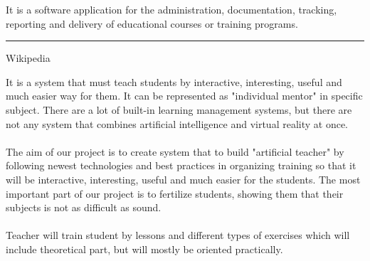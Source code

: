 \documentclass[a4paper, 12pt]{article}
\newenvironment{myblock}[1]{%
	\tcolorbox[beamer,%
	noparskip,breakable,
	colback=LightGreen,colframe=DarkGreen,%
	colbacklower=LimeGreen!75!LightGreen,%
	title=#1]}%
{\endtcolorbox}
\begin{document}
	\vspace{1cm}
	\large{
		\begin{myblock}{"Learning management system"}
			It is a software application for the administration, documentation, tracking, reporting and delivery of educational courses or training programs.
			\rule{\textwidth}{0.4pt}
			{
				\begin{flushright}
					{\Large Wikipedia}
				\end{flushright}
			}
		\end{myblock}
		\vspace{1cm}
		\begin{myblock}{"Artificial teacher"}
			It is a system that must teach students by interactive, interesting, useful and much easier way for them. It can be represented as "individual mentor" in specific subject.
		\end{myblock}
		\vspace{1cm}
		There are a lot of built-in learning management systems, but there are not any system that combines artificial intelligence and virtual reality at once. \\
		\\
		The aim of our project is to create system that to build "artificial teacher" by following newest technologies and best practices in organizing training so that it will be interactive, interesting, useful and much easier for the students. The most important part of our project is to fertilize students, showing them that their subjects is not as difficult as sound.\\
		\\		
		Teacher will train student by lessons and different types of exercises which will include theoretical part, but will mostly be oriented practically. 
	}
\end{document}

